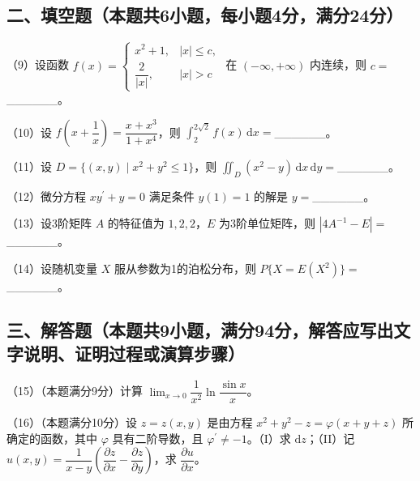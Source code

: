\documentclass[UTF8,12pt]{ctexart}
\begin{document}
\subsection*{二、填空题（本题共6小题，每小题4分，满分24分）}

（9）设函数 \(\displaystyle f(x)=\begin{cases}x^2+1,\allowbreak &|x|\le c,\allowbreak \\\dfrac{\displaystyle 2}{\displaystyle |x|},\allowbreak &|x|>c\end{cases}\) 在 \(\displaystyle ( -\infty,\allowbreak +\infty)\) 内连续，则 \(\displaystyle c=\)\_\_\_\_\_\_。


（10）设 \(\displaystyle f\!\left(x+\dfrac{\displaystyle 1}{\displaystyle x}\right)=\dfrac{\displaystyle x+x^3}{\displaystyle 1+x^4}\)，则 \(\displaystyle \int_2^{2\sqrt2}f(x)\,\mathrm dx=\)\_\_\_\_\_\_。


（11）设 \(\displaystyle D=\{(x,\allowbreak y)\mid x^2+y^2\le1\}\)，则 \(\displaystyle \iint_D(x^2-y)\,\mathrm dx\,\mathrm dy=\)\_\_\_\_\_\_。


（12）微分方程 \(\displaystyle xy^{\prime}+y=0\) 满足条件 \(\displaystyle y(1)=1\) 的解是 \(\displaystyle y=\)\_\_\_\_\_\_。


（13）设3阶矩阵 \(\displaystyle A\) 的特征值为 \(\displaystyle 1,\allowbreak 2,\allowbreak 2\)，\(\displaystyle E\) 为3阶单位矩阵，则 \(\displaystyle |4A^{-1}-E|=\)\_\_\_\_\_\_。


（14）设随机变量 \(\displaystyle X\) 服从参数为1的泊松分布，则 \(\displaystyle P\{X=E(X^2)\}=\)\_\_\_\_\_\_。


\subsection*{三、解答题（本题共9小题，满分94分，解答应写出文字说明、证明过程或演算步骤）}

（15）（本题满分9分）计算 \(\displaystyle \lim_{x\to0}\dfrac{\displaystyle 1}{\displaystyle x^2}\ln\dfrac{\displaystyle \sin x}{\displaystyle x}\)。


（16）（本题满分10分）设 \(\displaystyle z=z(x,\allowbreak y)\) 是由方程 \(\displaystyle x^2+y^2-z=\varphi(x+y+z)\) 所确定的函数，其中 \(\displaystyle \varphi\) 具有二阶导数，且 \(\displaystyle \varphi^{\prime}\ne-1\)。（I）求 \(\displaystyle \mathrm dz\)；（II）记 \(\displaystyle u(x,\allowbreak y)=\dfrac{\displaystyle 1}{\displaystyle x-y}\left(\dfrac{\displaystyle \partial z}{\displaystyle \partial x}-\dfrac{\displaystyle \partial z}{\displaystyle \partial y}\right)\)，求 \(\displaystyle \dfrac{\displaystyle \partial u}{\displaystyle \partial x}\)。
\end{document}
